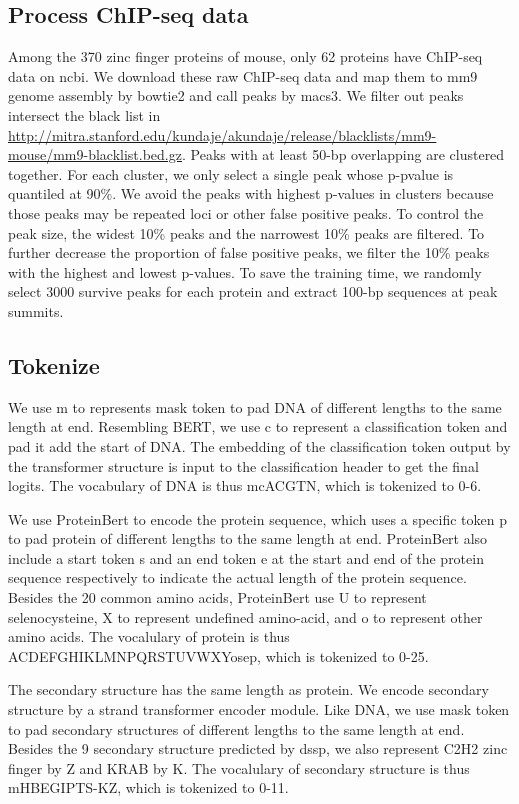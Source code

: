 \documentclass{article}
\begin{document}
\subsection{Process ChIP-seq data}
Among the 370 zinc finger proteins of mouse, only 62 proteins have ChIP-seq data on ncbi. We download these raw ChIP-seq data and map them to mm9 genome assembly by bowtie2 and call peaks by macs3. We filter out peaks intersect the black list in \url{http://mitra.stanford.edu/kundaje/akundaje/release/blacklists/mm9-mouse/mm9-blacklist.bed.gz}. Peaks with at least 50-bp overlapping are clustered together. For each cluster, we only select a single peak whose p-pvalue is quantiled at 90\%. We avoid the peaks with highest p-values in clusters because those peaks may be repeated loci or other false positive peaks. To control the peak size, the widest 10\% peaks and the narrowest 10\% peaks are filtered. To further decrease the proportion of false positive peaks, we filter the 10\% peaks with the highest and lowest p-values. To save the training time, we randomly select 3000 survive peaks for each protein and extract 100-bp sequences at peak summits.

\subsection{Tokenize}

We use m to represents mask token to pad DNA of different lengths to the same length at end. Resembling BERT\cite{devlin-etal-2019-bert}, we use c to represent a classification token and pad it add the start of DNA. The embedding of the classification token output by the transformer structure is input to the classification header to get the final logits. The vocabulary of DNA is thus mcACGTN, which is tokenized to 0-6.

We use ProteinBert to encode the protein sequence, which uses a specific token p to pad protein of different lengths to the same length at end\cite{10.1093/bioinformatics/btac020}. ProteinBert also include a start token s and an end token e at the start and end of the protein sequence respectively to indicate the actual length of the protein sequence. Besides the 20 common amino acids, ProteinBert use U to represent selenocysteine, X to represent undefined amino-acid, and o to represent other amino acids. The vocalulary of protein is thus ACDEFGHIKLMNPQRSTUVWXYosep, which is tokenized to 0-25.

The secondary structure has the same length as protein. We encode secondary structure by a strand transformer encoder module. Like DNA, we use mask token to pad secondary structures of different lengths to the same length at end. Besides the 9 secondary structure predicted by dssp, we also represent C2H2 zinc finger by Z and KRAB by K. The vocalulary of secondary structure is thus mHBEGIPTS-KZ, which is tokenized to 0-11.
\end{document}
